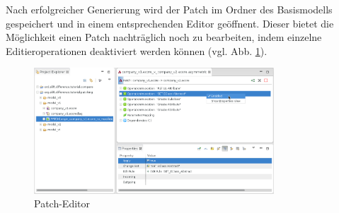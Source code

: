 Nach erfolgreicher Generierung wird der Patch im Ordner des Basismodells gespeichert und in einem entsprechenden Editor geöffnent.
Dieser bietet die Möglichkeit einen Patch nachträglich noch zu bearbeiten, indem einzelne Editieroperationen deaktiviert werden können (vgl. Abb. \ref{silift-tutorial_patching_modify_patch}).

\begin{figure}[H]
\centering
\includegraphics[width=0.8\textwidth]{patching/graphics/silift-tutorial_patching_modify_patch.png}
\caption{Patch-Editor}
\label{silift-tutorial_patching_modify_patch}
\end{figure}